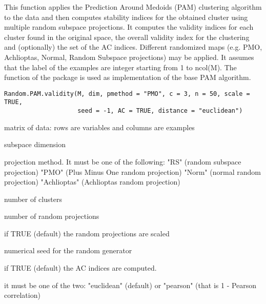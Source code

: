 \documentclass{article}
\begin{document}
\begin{Description}\relax
This function applies the Prediction Around Medoids (PAM) clustering algorithm to the data and then computes 
stability indices for the obtained cluster using multiple random subspace projections. 
It computes the validity indices for each cluster found in the original space, the overall validity index for the
clustering and (optionally) the set of the AC indices.
Different randomized maps (e.g. PMO, Achlioptas, Normal, Random Subspace projections) may be applied.
It assumes that the label of the examples are integer starting from 1 to ncol(M).
The  function of the package  is used as implementation of the base PAM algorithm.
\end{Description}
\begin{Usage}
\begin{verbatim}
Random.PAM.validity(M, dim, pmethod = "PMO", c = 3, n = 50, scale = TRUE, 
                    seed = -1, AC = TRUE, distance = "euclidean")
\end{verbatim}
\end{Usage}
\begin{Arguments}
\begin{ldescription}
\item[\code{M}] matrix of data: rows are variables and columns are examples 
\item[\code{dim}] subspace dimension 
\item[\code{pmethod}] projection method. It must be one of the following: 
"RS" (random subspace projection)
"PMO" (Plus Minus One random projection)
"Norm" (normal random projection)
"Achlioptas" (Achlioptas random projection) 
\item[\code{c}] number of clusters 
\item[\code{n}] number of  random projections 
\item[\code{scale}] if TRUE (default) the random projections are scaled 
\item[\code{seed}] numerical seed for the random generator 
\item[\code{AC}] if TRUE (default) the AC indices are computed. 
\item[\code{distance}] it must be one of the two: "euclidean" (default) or "pearson" (that is 1 - Pearson correlation) 
\end{ldescription}
\end{Arguments}
\end{document}

